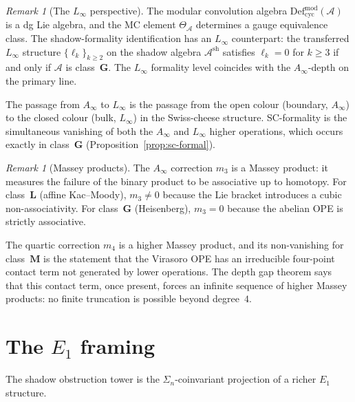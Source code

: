 \documentclass[11pt,reqno]{amsart}
\theoremstyle{definition}
\theoremstyle{remark}
\newtheorem{remark}[theorem]{Remark}
\newcommand{\cA}{\mathcal{A}}
\newcommand{\Defcyc}{\mathrm{Def}_{\mathrm{cyc}}}
\numberwithin{equation}{section}
\begin{document}
\begin{remark}[The $L_\infty$ perspective]
\label{rem:linfty-formality}
The modular convolution algebra
$\Defcyc^{\mathrm{mod}}(\cA)$ is a dg Lie algebra, and
the MC element $\Theta_\cA$ determines a gauge equivalence
class. The shadow-formality identification has an
$L_\infty$ counterpart: the transferred $L_\infty$ structure
$\{\ell_k\}_{k \ge 2}$ on the shadow algebra
$\cA^{\mathrm{sh}}$ satisfies $\ell_k = 0$ for $k \ge 3$ if
and only if $\cA$ is class~$\mathbf{G}$. The $L_\infty$
formality level coincides with the $A_\infty$-depth on
the primary line.

The passage from $A_\infty$ to $L_\infty$ is the
passage from the open colour (boundary, $A_\infty$) to the
closed colour (bulk, $L_\infty$) in the Swiss-cheese
structure. SC-formality is the simultaneous vanishing of
both the $A_\infty$ and $L_\infty$ higher operations, which
occurs exactly in class~$\mathbf{G}$
(Proposition~\ref{prop:sc-formal}).
\end{remark}

\begin{remark}[Massey products]
\label{rem:massey}
The $A_\infty$ correction $m_3$ is a Massey product: it
measures the failure of the binary product to be
associative up to homotopy. For class~$\mathbf{L}$
(affine Kac--Moody), $m_3 \ne 0$ because the Lie bracket
introduces a cubic non-associativity. For class~$\mathbf{G}$
(Heisenberg), $m_3 = 0$ because the abelian OPE is strictly
associative.

The quartic correction $m_4$ is a higher Massey product,
and its non-vanishing for class~$\mathbf{M}$ is the
statement that the Virasoro OPE has an irreducible
four-point contact term not generated by lower operations.
The depth gap theorem says that this contact term, once
present, forces an infinite sequence of higher Massey
products: no finite truncation is possible beyond
degree~$4$.
\end{remark}



\section{The $E_1$ framing}\label{sec:e1}

The shadow obstruction tower is the $\Sigma_n$-coinvariant
projection of a richer $E_1$ structure.
\end{document}
